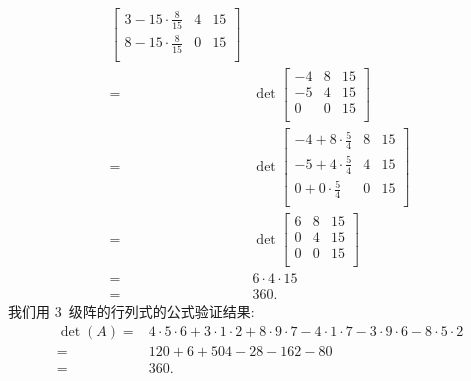 \begin{example}
\begin{align*}
{\begin{bmatrix}
                3 - 15 \cdot \frac{8}{15} & 4 & 15 \\
                8 - 15 \cdot \frac{8}{15} & 0 & 15 \\
            \end{bmatrix}
        }
        \\
        = {} &
        \det {
            \begin{bmatrix}
                -4 & 8 & 15 \\
                -5 & 4 & 15 \\
                0  & 0 & 15 \\
            \end{bmatrix}
        }
        \\
        = {} &
        \det {
            \begin{bmatrix}
                -4 + 8 \cdot \frac{5}{4} & 8 & 15 \\
                -5 + 4 \cdot \frac{5}{4} & 4 & 15 \\
                0 + 0 \cdot \frac{5}{4}  & 0 & 15 \\
            \end{bmatrix}
        }
        \\
        = {} &
        \det {
            \begin{bmatrix}
                6 & 8 & 15 \\
                0 & 4 & 15 \\
                0 & 0 & 15 \\
            \end{bmatrix}
        }
        \\
        = {} &
        6 \cdot 4 \cdot 15
        \\
        = {} &
        360.
    \end{align*}
    我们用 \(3\)~级阵的行列式的公式验证结果:
    \begin{align*}
        \det {(A)}
        = {} &
        4 \cdot 5 \cdot 6
        + 3 \cdot 1 \cdot 2
        + 8 \cdot 9 \cdot 7
        - 4 \cdot 1 \cdot 7
        - 3 \cdot 9 \cdot 6
        - 8 \cdot 5 \cdot 2
        \\
        = {} &
        120 + 6 + 504 - 28 - 162 - 80
        \\
        = {} & 360.
    \end{align*}
\end{example}

